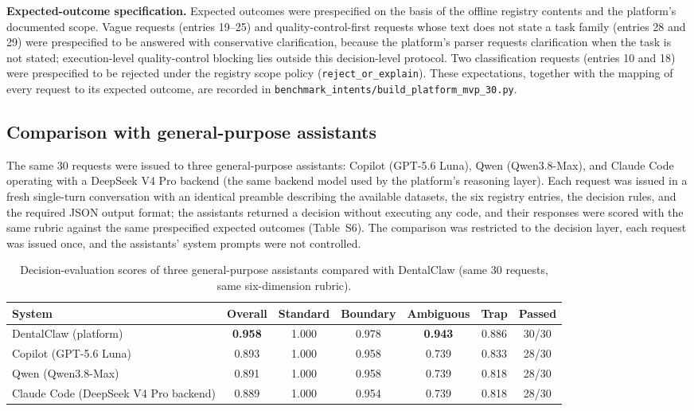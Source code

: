 \documentclass[11pt]{article}
\begin{document}
\begin{table}[!ht]
\textbf{Expected-outcome specification.} Expected outcomes were prespecified on the basis of the offline registry contents and the platform's documented scope. Vague requests (entries 19--25) and quality-control-first requests whose text does not state a task family (entries 28 and 29) were prespecified to be answered with conservative clarification, because the platform's parser requests clarification when the task is not stated; execution-level quality-control blocking lies outside this decision-level protocol. Two classification requests (entries 10 and 18) were prespecified to be rejected under the registry scope policy (\texttt{reject\_or\_explain}). These expectations, together with the mapping of every request to its expected outcome, are recorded in \texttt{benchmark\_intents/build\_platform\_mvp\_30.py}.
\end{table}

\subsection{Comparison with general-purpose assistants}

The same 30 requests were issued to three general-purpose assistants: Copilot (GPT-5.6 Luna), Qwen (Qwen3.8-Max), and Claude Code operating with a DeepSeek V4 Pro backend (the same backend model used by the platform's reasoning layer). Each request was issued in a fresh single-turn conversation with an identical preamble describing the available datasets, the six registry entries, the decision rules, and the required JSON output format; the assistants returned a decision without executing any code, and their responses were scored with the same rubric against the same prespecified expected outcomes (Table~S6). The comparison was restricted to the decision layer, each request was issued once, and the assistants' system prompts were not controlled.

\begin{table}[!ht]
\centering
\small
\caption{Decision-evaluation scores of three general-purpose assistants compared with DentalClaw (same 30 requests, same six-dimension rubric).}
\label{tab:supp_assistants}
\begin{tabular}{l c c c c c c}
\toprule
System & Overall & Standard & Boundary & Ambiguous & Trap & Passed \\
\midrule
DentalClaw (platform) & \textbf{0.958} & 1.000 & 0.978 & \textbf{0.943} & 0.886 & 30/30 \\
Copilot (GPT-5.6 Luna) & 0.893 & 1.000 & 0.958 & 0.739 & 0.833 & 28/30 \\
Qwen (Qwen3.8-Max) & 0.891 & 1.000 & 0.958 & 0.739 & 0.818 & 28/30 \\
Claude Code (DeepSeek V4 Pro backend) & 0.889 & 1.000 & 0.954 & 0.739 & 0.818 & 28/30 \\
\bottomrule
\end{tabular}
\end{table}
\end{document}
